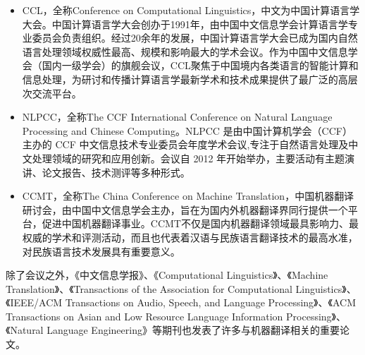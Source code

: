 \begin{itemize}
\item CCL，全称Conference on Computational Linguistics，中文为中国计算语言学大会。中国计算语言学大会创办于1991年，由中国中文信息学会计算语言学专业委员会负责组织。经过20余年的发展，中国计算语言学大会已成为国内自然语言处理领域权威性最高、规模和影响最大的学术会议。作为中国中文信息学会（国内一级学会）的旗舰会议，CCL聚焦于中国境内各类语言的智能计算和信息处理，为研讨和传播计算语言学最新学术和技术成果提供了最广泛的高层次交流平台。
\vspace{0.5em}
\item NLPCC，全称The CCF International Conference on Natural Language Processing and Chinese Computing。NLPCC 是由中国计算机学会（CCF）主办的 CCF 中文信息技术专业委员会年度学术会议,专注于自然语言处理及中文处理领域的研究和应用创新。会议自 2012 年开始举办，主要活动有主题演讲、论文报告、技术测评等多种形式。
\vspace{0.5em}
\item CCMT，全称The China Conference on Machine Translation，中国机器翻译研讨会，由中国中文信息学会主办，旨在为国内外机器翻译界同行提供一个平台，促进中国机器翻译事业。CCMT不仅是国内机器翻译领域最具影响力、最权威的学术和评测活动，而且也代表着汉语与民族语言翻译技术的最高水准，对民族语言技术发展具有重要意义。
\vspace{0.5em}
\end{itemize}

除了会议之外，《中文信息学报》、《Computational Linguistics》、《Machine Translation》、《Transactions of the Association for Computational Linguistics》、《IEEE/ACM Transactions on Audio, Speech, and Language Processing》、《ACM Transactions on Asian and Low Resource Language Information Processing》、《Natural Language Engineering》等期刊也发表了许多与机器翻译相关的重要论文。










